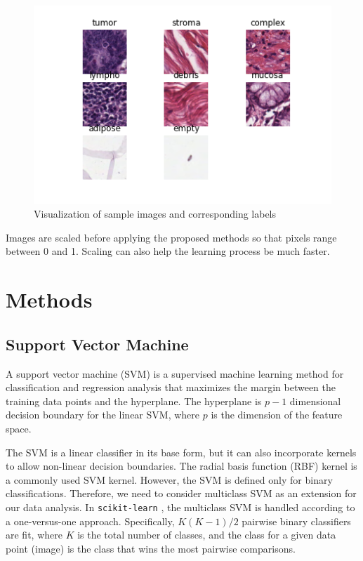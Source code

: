 \documentclass[letterpaper]{article} %
\begin{document}
\begin{figure}[t]
\centering
\includegraphics[width=0.9\columnwidth]{figures/intro.png} 
\caption{Visualization of sample images and corresponding labels}
\label{fig1}
\end{figure}

Images are scaled before applying the proposed methods so that pixels range between 0 and 1. Scaling can also help the learning process be much faster. 

\section{Methods}

\subsection{Support Vector Machine}

A support vector machine (SVM) \cite{boser1992training} is a supervised machine learning method for classification and regression analysis that maximizes the margin between the training data points and the hyperplane. The hyperplane is $p-1$ dimensional decision boundary for the linear SVM, where $p$ is the dimension of the feature space. 

The SVM is a linear classifier in its base form, but it can also incorporate kernels to allow non-linear decision boundaries. The radial basis function (RBF) kernel is a commonly used SVM kernel. However, the SVM is defined only for binary classifications. Therefore, we need to consider multiclass SVM as an extension for our data analysis. In \texttt{scikit-learn} \cite{scikit-learn}, the multiclass SVM is handled according to a one-versus-one approach. Specifically, $K(K-1)/2$ pairwise binary classifiers are fit, where $K$ is the total number of classes, and the class for a given data point (image) is the class that wins the most pairwise comparisons.
\end{document}
